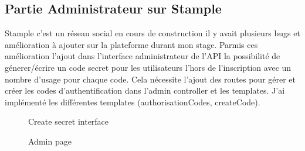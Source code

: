 \documentclass[12pt,oneside,a4paper]{article}
\begin{document}
\subsection{Partie Administrateur sur Stample}
Stample c'est un réseau social en cours de construction il y avait plusieurs bugs et amélioration à ajouter sur la plateforme durant mon stage.
Parmis ces amélioration l'ajout dans l'interface administrateur de l'API la possibilité de génerer/écrire un code
secret pour les utilisateurs l'hors de l'inscription avec un nombre d'usage pour chaque code.
Cela nécessite l'ajout des routes pour gérer et créer les codes d'authentification dans l'admin 
controller et les templates.
J'ai implémenté les différentes templates (authorisationCodes, createCode).
\begin{figure}[htbp]
\begin{minipage}[c]{.5\linewidth}
\begin{center}
\hspace{1em}
\caption{Create secret interface}
\label{fig:Create authorisationCode interface}
\end{center}
\end{minipage}
\hfill
\begin{minipage}[c]{.5\linewidth}
\begin{center}
\caption{Admin page}
\label{fig:Admin page}
\end{center}
\end{minipage}
\end{figure}
\end{document}
